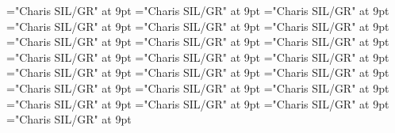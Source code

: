 \documentclass[gps1,twoside]{article}
\begin{document}
\font\academicdomainacademicdomainacademicdomainssensesensessubentrysubentriesentrybefore="Charis SIL/GR" at 9pt
\font\academicdomainssensesensessubentrysubentriesentrybefore="Charis SIL/GR" at 9pt
\font\academicdomainssensesensessubentrysubentriesentryafter="Charis SIL/GR" at 9pt
\font\spanspanabbreviationacademicdomainacademicdomainssensesensessubentrysubentriesentrybefore="Charis SIL/GR" at 9pt
\font\spanspannameacademicdomainacademicdomainssensesensessubentrysubentriesentrybefore="Charis SIL/GR" at 9pt
\font\spannameacademicdomainacademicdomainssensesensessubentrysubentriesentryfirstchildbefore="Charis SIL/GR" at 9pt
\font\spannameacademicdomainacademicdomainssensesensessubentrysubentriesentrylastchildafter="Charis SIL/GR" at 9pt
\font\usageusageusagessensesensessubentrysubentriesentrybefore="Charis SIL/GR" at 9pt
\font\usagessensesensessubentrysubentriesentrybefore="Charis SIL/GR" at 9pt
\font\usagessensesensessubentrysubentriesentryafter="Charis SIL/GR" at 9pt
\font\spanspanabbreviationusageusagessensesensessubentrysubentriesentrybefore="Charis SIL/GR" at 9pt
\font\visiblecomplexformbackrefvisiblecomplexformbackrefvisiblecomplexformbackrefssensesensessubentrysubentriesentrybefore="Charis SIL/GR" at 9pt
\font\visiblecomplexformbackrefssensesensessubentrysubentriesentryafter="Charis SIL/GR" at 9pt
\font\complexformtypesvisiblecomplexformbackrefvisiblecomplexformbackrefssensesensessubentrysubentriesentryafter="Charis SIL/GR" at 9pt
\font\spanspanreverseabbrcomplexformtypecomplexformtypesvisiblecomplexformbackrefvisiblecomplexformbackrefssensesensessubentrysubentriesentrybefore="Charis SIL/GR" at 9pt
\font\spanspanheadwordvisiblecomplexformbackrefvisiblecomplexformbackrefssensesensessubentrysubentriesentrybefore="Charis SIL/GR" at 9pt
\font\spanspanowningentrysummarydefinitionvisiblecomplexformbackrefvisiblecomplexformbackrefssensesensessubentrysubentriesentrybefore="Charis SIL/GR" at 9pt
\font\spanowningentrysummarydefinitionvisiblecomplexformbackrefvisiblecomplexformbackrefssensesensessubentrysubentriesentryfirstchildbefore="Charis SIL/GR" at 9pt
\font\spanowningentrysummarydefinitionvisiblecomplexformbackrefvisiblecomplexformbackrefssensesensessubentrysubentriesentrylastchildafter="Charis SIL/GR" at 9pt
\font\nontrivialentryrootnontrivialentryrootnontrivialentryrootsvisiblecomplexformbackrefvisiblecomplexformbackrefssensesensessubentrysubentriesentrybefore="Charis SIL/GR" at 9pt
\font\nontrivialentryrootsvisiblecomplexformbackrefvisiblecomplexformbackrefssensesensessubentrysubentriesentrybefore="Charis SIL/GR" at 9pt
\font\nontrivialentryrootsvisiblecomplexformbackrefvisiblecomplexformbackrefssensesensessubentrysubentriesentryafter="Charis SIL/GR" at 9pt
\end{document}
